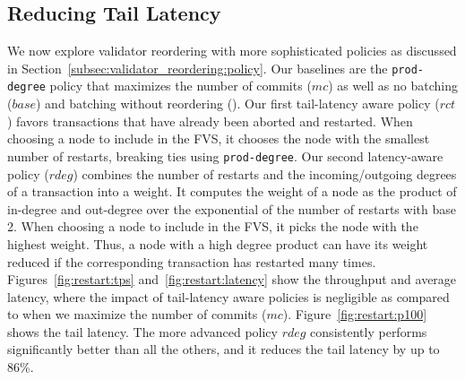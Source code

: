 \subsection{Reducing Tail Latency}
\label{subsec:experiment:policy}

We now explore validator reordering with more sophisticated policies as discussed in Section~\ref{subsec:validator_reordering:policy}.
Our baselines are the \texttt{prod-degree} policy that maximizes the number of commits ($mc$) as well as no batching ($base$) and batching without reordering (). 
Our first tail-latency aware policy ($rct$) favors transactions that have already been aborted and restarted. When choosing a node to include in the FVS, it chooses the node with the smallest number of restarts, breaking ties using \texttt{prod-degree}.
Our second latency-aware policy ($rdeg$) combines the number of restarts and the incoming/outgoing degrees of a transaction into a weight. It computes the weight of a node as
the product of in-degree and out-degree over the exponential of the number of
restarts with base 2. When choosing a node to include in the FVS, it picks the node with the highest weight. Thus, a node with a high degree product can have its weight reduced if the corresponding transaction has restarted many times.
Figures~\ref{fig:restart:tps} and~\ref{fig:restart:latency} show the throughput
and average latency, where the impact of tail-latency aware policies is negligible as compared to when we maximize the number of commits ($mc$).
Figure~\ref{fig:restart:p100} shows the 
tail latency. 
 The more advanced policy $rdeg$ consistently performs significantly better than all the others, and it reduces the tail latency by up to 86\%.

